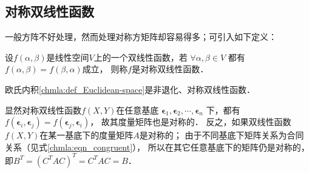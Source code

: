\subsection{对称双线性函数}\label{chmla:sec_sbf}
一般方阵不好处理，然而处理对称方矩阵却容易得多；可引入如下定义：
\begin{definition}
    设$f(\alpha,\beta)$是线性空间$V$上的一个双线性函数，若
    $\forall \alpha,\beta \in V$ 都有$f(\alpha,\beta)=f(\beta,\alpha)$成立，
    则称$f$是{\heiti 对称双线性函数}． 
\end{definition}
\begin{example}
    欧氏内积\ref{chmla:def_Euclidean-space}是非退化、对称双线性函数．
\end{example}



显然对称双线性函数$f(X,Y)$在任意基底
$\boldsymbol{\epsilon}_1,\boldsymbol{\epsilon}_2,\cdots,\boldsymbol{\epsilon}_n$
下，都有
$f(\boldsymbol{\epsilon}_i,\boldsymbol{\epsilon}_j)=
f(\boldsymbol{\epsilon}_j,\boldsymbol{\epsilon}_i)$，
故其度量矩阵也是对称的．
反之，如果双线性函数$f(X,Y)$在某一基底下的度量矩阵$A$是对称的；
由于不同基底下矩阵关系为合同关系（见式\eqref{chmla:eqn_congruent}），
所以在其它任意基底下的矩阵仍是对称的，
即$B^T=(C^T A C)^T = C^T A C=B$．

